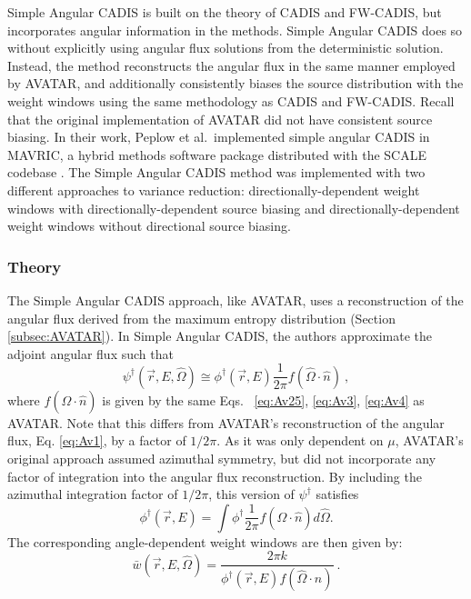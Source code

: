 Simple Angular CADIS \cite{peplow_consistent_2012} is built on the theory of CADIS
and FW-CADIS, but incorporates angular information in the
methods. Simple Angular CADIS does so without explicitly using
angular flux solutions from the deterministic solution.
Instead, the method reconstructs the angular flux in the same manner employed by
AVATAR, and additionally consistently
biases the
source distribution with the weight windows using the same methodology as CADIS
and FW-CADIS. Recall that the original
implementation of AVATAR did not have consistent source biasing.
In their work, Peplow et al.\ implemented simple angular CADIS
in MAVRIC, a hybrid methods software package distributed with the SCALE
codebase \cite{SCALE6_1}. The Simple Angular CADIS method was implemented with
two different
approaches to variance reduction:
directionally-dependent weight windows with directionally-dependent source
biasing and directionally-dependent weight windows without directional source
biasing.

\subsubsection*{Theory}

The Simple Angular CADIS approach, like AVATAR, uses a reconstruction of the
angular flux derived from the maximum entropy distribution (Section
\ref{subsec:AVATAR}). In Simple Angular CADIS, the authors approximate the
adjoint angular flux such that
%
\begin{equation}
\psi^{\dagger}(\vec{r}, E, \hat \Omega) \cong \phi^{\dagger}(\vec{r}, E)
\frac{1}{2\pi} f(\hat\Omega \cdot \hat n)\:,
\label{eq:AvAngflux}
\end{equation}
where $f(\hat\Omega \cdot \hat n)$ is given by the same Eqs. \
\eqref{eq:Av25}, \eqref{eq:Av3}, \eqref{eq:Av4} as AVATAR.
Note that this differs from AVATAR's reconstruction of the angular flux,
Eq. \eqref{eq:Av1}, by a factor of $1/2\pi$. As it was only dependent on
$\mu$, AVATAR's original approach assumed azimuthal symmetry, but did not
incorporate any factor of integration into the angular flux reconstruction. By
including the azimuthal integration factor of $1/2\pi$, this version of
$\psi^{\dagger}$ satisfies
\begin{equation*}
  \phi^{\dagger}(\vec{r}, E) = \int \phi^{\dagger} \frac{1}{2\pi} f(\hat\Omega
  \cdot \hat n) d \hat\Omega .
\end{equation*}
The corresponding angle-dependent weight windows are then given by:
\begin{equation}
\bar {w} (\vec{r},E,\hat\Omega) = \frac{2 \pi k}{\phi^{\dagger}(\vec{r},E)
                                  f(\hat\Omega \cdot n)} \:.
\end{equation}

